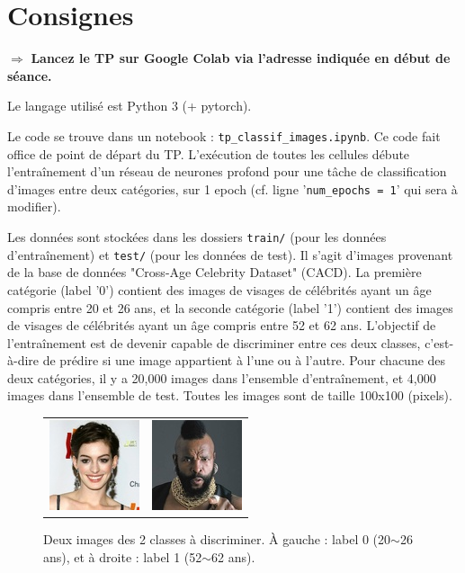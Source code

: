 \documentclass[a4paper,11pt]{article}
\date{}
\begin{document}
\section{Consignes}

$\Rightarrow$ \textbf{Lancez le TP sur Google Colab via l'adresse indiquée en début de séance.} 
\newline

Le langage utilisé est Python 3 (+ pytorch). 

Le code se trouve dans un notebook : \texttt{tp\_classif\_images.ipynb}. Ce code fait office de point de départ du TP. L'exécution de toutes les cellules débute l'entraînement d'un réseau de neurones profond pour une tâche de classification d'images entre deux catégories, sur 1 epoch (cf. ligne '\texttt{num\_epochs = 1}' qui sera à modifier).

Les données sont stockées dans les dossiers \texttt{train/} (pour les données d'entraînement) et \texttt{test/} (pour les données de test). Il s'agit d'images provenant de la base de données "Cross-Age Celebrity Dataset" (CACD). La première catégorie (label '0') contient des images de visages de célébrités ayant un âge compris entre 20 et 26 ans, et la seconde catégorie (label '1') contient des images de visages de célébrités ayant un âge compris entre 52 et 62 ans. L'objectif de l'entraînement est de devenir capable de discriminer entre ces deux classes, c'est-à-dire de prédire si une image appartient à l'une ou à l'autre. Pour chacune des deux catégories, il y a 20,000 images dans l'ensemble d'entraînement, et 4,000 images dans l'ensemble de test. Toutes les images sont de taille 100x100 (pixels).

\begin{figure}[ht]
\centering
\begin{tabular}{cc}
\includegraphics[width=0.3\linewidth]{AH.jpg}
& 
\includegraphics[width=0.3\linewidth]{MrT.jpg}
\end{tabular}
\caption{Deux images des 2 classes à discriminer. À gauche : label 0 (20$\sim$26 ans), et à droite : label 1 (52$\sim$62 ans).}
\end{figure}
\end{document}
